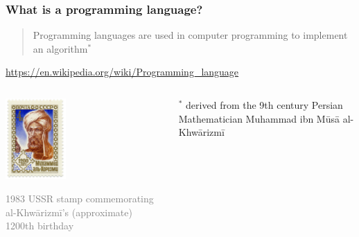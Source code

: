 \documentclass[xcolor=x11names]{beamer}
\newcommand{\light}[1]{\textcolor{gray}{#1}}
\begin{document}
\begin{frame}
\frametitle{What is a programming language?}

\begin{quote}
Programming languages are used in computer programming to implement an 
\alert{algorithm}$^*$
\end{quote}
\begin{flushright}
\footnotesize
 \light{\url{https://en.wikipedia.org/wiki/Programming_language}}
\end{flushright}
\pause 

\begin{columns}
\begin{column}{0.4\textwidth}
\begin{center}
\includegraphics[width=23mm]{img/1983_CPA_5426.png}
\end{center}
\footnotesize
\light{1983 USSR stamp commemorating al-Khwārizmī's (approximate) 1200th 
birthday}
\end{column}

\begin{column}{0.55\textwidth}

$^*$ derived from the 9th century Persian Mathematician Muhammad ibn Mūsā 
al-Khwārizmī
\vspace{10mm}
\end{column}
\end{columns}
\end{frame}
\end{document}

